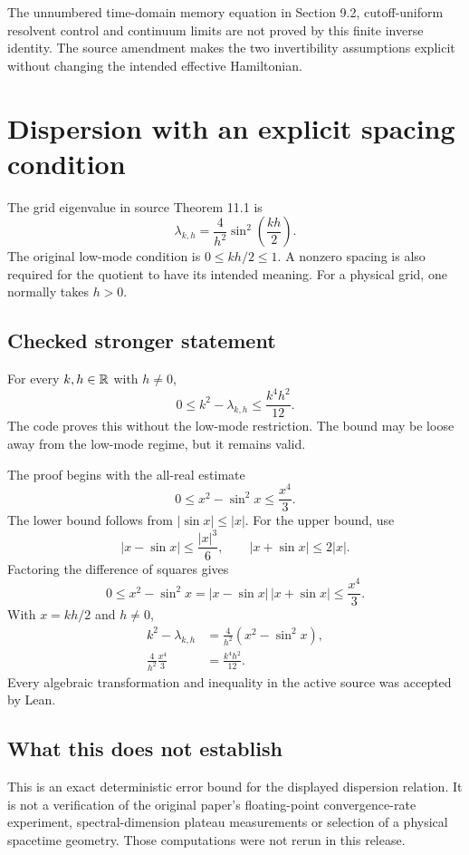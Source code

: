 The unnumbered time-domain memory equation in Section 9.2, cutoff-uniform resolvent control and continuum limits are not proved by this finite inverse identity. The source amendment makes the two invertibility assumptions explicit without changing the intended effective Hamiltonian.



\section{Dispersion with an explicit spacing condition}\label{supp1:section:004}
The grid eigenvalue in source Theorem 11.1 is
\[
\lambda_{k,h}=\frac{4}{h^2}\sin^2\left(\frac{kh}{2}\right).
\]
The original low-mode condition is $0\le kh/2\le1$. A nonzero spacing is also required for the quotient to have its intended meaning. For a physical grid, one normally takes $h>0$.

\subsection{Checked stronger statement}
For every $k,h\in\R$ with $h\ne0$,
\[
\boxed{0\le k^2-\lambda_{k,h}\le\frac{k^4h^2}{12}.}
\]
The code proves this without the low-mode restriction. The bound may be loose away from the low-mode regime, but it remains valid.

The proof begins with the all-real estimate
\[
0\le x^2-\sin^2x\le\frac{x^4}{3}.
\]
The lower bound follows from $|\sin x|\le|x|$. For the upper bound, use
\[
|x-\sin x|\le\frac{|x|^3}{6},\qquad
|x+\sin x|\le2|x|.
\]
Factoring the difference of squares gives
\[
0\le x^2-\sin^2x
=|x-\sin x|\,|x+\sin x|
\le\frac{x^4}{3}.
\]
With $x=kh/2$ and $h\ne0$,
\begin{align*}
k^2-\lambda_{k,h}
&=\frac4{h^2}\left(x^2-\sin^2x\right),\\
\frac4{h^2}\frac{x^4}{3}
&=\frac{k^4h^2}{12}.
\end{align*}
Every algebraic transformation and inequality in the active source was accepted by Lean.



\subsection{What this does not establish}
This is an exact deterministic error bound for the displayed dispersion relation. It is not a verification of the original paper's floating-point convergence-rate experiment, spectral-dimension plateau measurements or selection of a physical spacetime geometry. Those computations were not rerun in this release.



